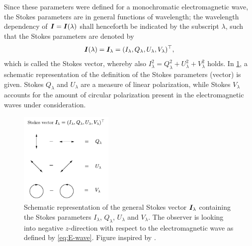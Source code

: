 \documentclass[a4paper,12pt]{report}
\begin{document}
\begin{align}
\begin{aligned}
\end{aligned}
\end{align} Since these parameters were defined for a monochromatic electromagnetic wave, the Stokes parameters are in general functions of wavelength; the wavelength dependency of $\bm{I} = \bm{I}(\lambda)$ shall henceforth be indicated by the subscript $\lambda$, such that the Stokes parameters are denoted by \begin{equation}
\bm{I}(\lambda) = \bm{I}_\lambda = (I_\lambda, Q_\lambda, U_\lambda, V_\lambda)^\top,
\end{equation} which is called the Stokes vector, whereby also $I_\lambda^2 = Q_\lambda^2 + U_\lambda^2 + V_\lambda^2$ holds. In \cref{fig:stokesvector}, a schematic representation of the definition of the Stokes parameters (vector) is given. Stokes $Q_\lambda$ and $U_\lambda$ are a measure of linear polarization, while Stokes $V_\lambda$ accounts for the amount of circular polarization present in the electromagnetic waves under consideration.
\begin{figure}[h]
\centering
\includegraphics[width=4.5cm]{figures/stokesvector.pdf}
\caption{Schematic representation of the general Stokes vector $\bm{I}_\lambda$ containing the Stokes parameters $I_\lambda$, $Q_\lambda$, $U_\lambda$ and $V_\lambda$. The observer is looking into negative $z$-direction with respect to the electromagnetic wave as defined by \cref{eq:E-wave}. Figure inspired by \cite[p.17]{DeglInnocenti.2005}.}
\label{fig:stokesvector}
\end{figure}
\end{document}
